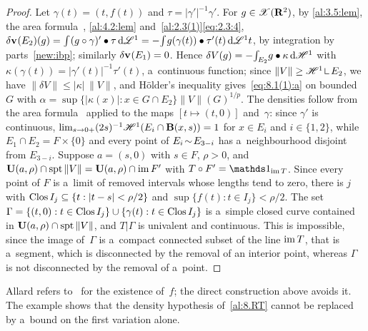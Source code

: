 \begin{proof}
    Let $\gamma(t) = (t, f(t))$ and $\tau = |\gamma'|^{-1} \gamma'$. For $g \in \mathscr{X}(\mathbf{R}^2)$, by
    \ref{al:3.5:lem}, the area formula~\cite[3.2.3]{Federer1969}, \ref{al:4.2:lem}
    and~\ref{al:2.3(1)}\eqref{eq:2.3:4}, $\delta \mathbf{v}_{}(E_2)(g) = {\textstyle\int_{}^{}} (g \circ \gamma)'
    \bullet \tau \,\mathrm{d} \mathscr{L}^1 = - {\textstyle\int_{}^{}} g(\gamma(t)) \bullet \tau'(t) \,\mathrm{d} \mathscr{L}^1 t$, by
    integration by parts~\ref{new:ibp}; similarly $\delta \mathbf{v}_{}(E_1) = 0$. Hence $\delta V(g) = -
    {\textstyle\int_{E_2}^{}} g \bullet \kappa \,\mathrm{d} \mathscr{H}^1$ with $\kappa(\gamma(t)) = |\gamma'(t)|^{-1}
    \tau'(t)$, a~continuous function; since $\|V\| \ge \HM^1 \restrict E_2$, we have $\|\delta V\|
    \le |\kappa| \, \|V\|$, and H\"older's inequality gives~\eqref{eq:8.1(1):a} on bounded~$G$ with
    $\alpha = \sup \{ |\kappa(x)| : x \in G \cap E_2 \} \|V\|(G)^{1/p}$. The densities follow
    from the area formula~\cite[3.2.3]{Federer1969} applied to the maps $[t \mapsto (t,0)]$
    and~$\gamma$: since $\gamma'$ is continuous, $\lim_{s \to 0+} (2s)^{-1} \mathscr{H}^1(E_i \cap
    \mathbf{B}(x,s)) = 1$ for $x \in E_i$ and $i \in \{1,2\}$, while $E_1 \cap E_2 = F \times \{0\}$
    and every point of $E_i \!\sim\! E_{3-i}$ has a~neighbourhood disjoint from $E_{3-i}$. Suppose $a = (s,0)$ with $s
    \in F$, $\rho > 0$, and $\mathbf{U}(a,\rho) \cap \operatorname{spt} \|V\| = \mathbf{U}(a,\rho) \cap \operatorname{im} F'$ with
    $T \circ F' = \id{\im T}$. Since every point of $F$ is a~limit of removed intervals whose
    lengths tend to zero, there is $j$ with $\mathop{\mathrm{Clos}}I_j \subseteq \{ t : |t - s| < \rho/2 \}$ and
    $\sup \{ f(t) : t \in I_j \} < \rho/2$. The set $\Gamma = \{ (t,0) : t \in \mathop{\mathrm{Clos}}I_j \} \cup \{
    \gamma(t) : t \in \mathop{\mathrm{Clos}}I_j \}$ is a~simple closed curve contained in $\mathbf{U}(a,\rho) \cap
    \operatorname{spt} \|V\|$, and $T | \Gamma$ is univalent and continuous. This is impossible, since the image
    of~$\Gamma$ is a~compact connected subset of the line $\operatorname{im} T$, that is a~segment, which is
    disconnected by the removal of an interior point, whereas $\Gamma$ is not disconnected by the
    removal of a~point.
\end{proof}

\begin{remark}
    \label{rem:8.1(2)}
    Allard refers to~\cite[3.1.14]{Federer1969} for the existence of~$f$; the direct construction
    above avoids it. The example shows that the density hypothesis of~\ref{al:8.RT} cannot be
    replaced by a~bound on the first variation alone.
\end{remark}

